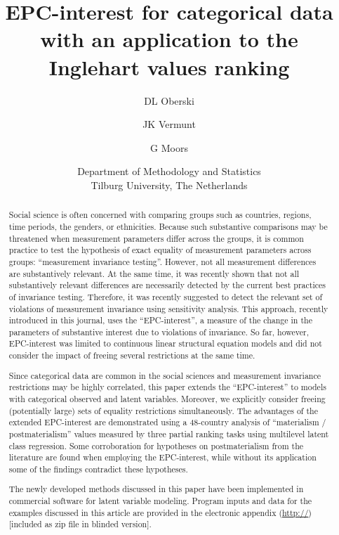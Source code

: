 \documentclass[letterpaper,12pt]{article}
\title{EPC-interest for categorical data with an application to the Inglehart values ranking}
\date{}
\author{DL Oberski \and JK Vermunt \and G Moors
\and
Department of Methodology and Statistics\\
Tilburg University, The Netherlands}
\begin{document}
\maketitle



\begin{abstract}
Social science is often concerned with comparing groups such as countries, regions, time periods, the genders, or ethnicities.
Because such substantive comparisons may be threatened when measurement parameters differ across the groups, it is common practice to test the hypothesis of exact equality of measurement parameters across groups:  ``measurement invariance testing''. However, not all measurement differences are substantively relevant. At the same time, it was recently shown that not all substantively relevant differences are necessarily detected by the current best practices of invariance testing. Therefore, it was recently suggested to detect the relevant set of violations of measurement invariance using sensitivity analysis. This approach, recently introduced in this journal, uses the ``EPC-interest'',  a measure of the change in the parameters of substantive interest due to violations of invariance. So far, however, EPC-interest was limited to continuous linear structural equation models and did not consider the impact of freeing several restrictions at the same time. 

Since categorical data are common in the social sciences and measurement invariance restrictions may be highly correlated, this paper extends the ``EPC-interest'' to models with categorical observed and latent variables. Moreover, we explicitly consider freeing (potentially large) sets of equality restrictions simultaneously. The advantages of the extended EPC-interest are demonstrated using a 48-country analysis of ``materialism / postmaterialism'' values measured by three partial ranking tasks using multilevel latent class regression. Some corroboration for hypotheses on postmaterialism from the literature are found when employing the EPC-interest, while without its application some of the findings contradict these hypotheses.

The newly developed methods discussed in this paper have been implemented in commercial software for latent variable modeling. Program inputs and data for the examples discussed in this article are provided in the electronic appendix (\url{http://}) [included as zip file in blinded version].
\end{abstract}
\end{document}

